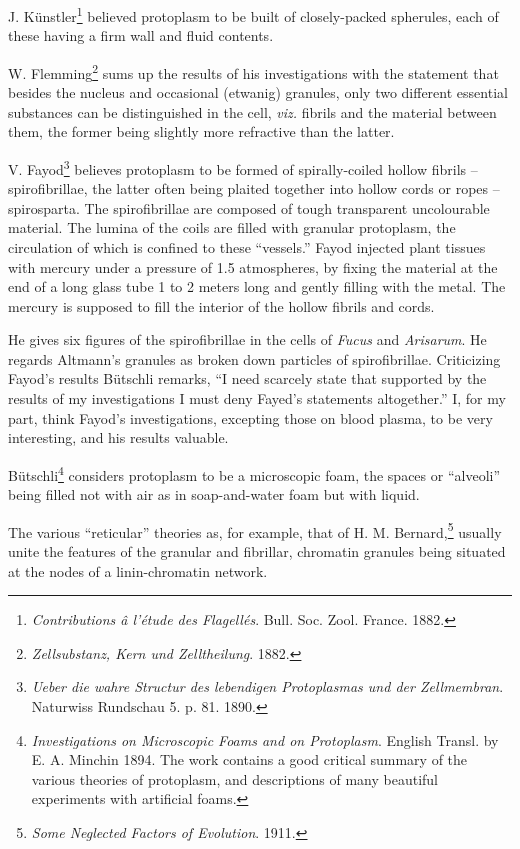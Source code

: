 \documentclass[a4paper, 12pt, oneside]{article}
\begin{document}
J. Künstler\footnote{\emph{Contributions â l'étude des Flagellés}. Bull. Soc. Zool. France. 1882.} believed protoplasm to be built of closely-packed spherules, each of these having a firm wall and fluid contents.

W. Flemming\footnote{\emph{Zellsubstanz, Kern und Zelltheilung}. 1882.} sums up the results of his investigations with the statement that besides the nucleus and occasional (etwanig) granules, only two different essential substances can be distinguished in the cell, \emph{viz.} fibrils and the material between them, the former being slightly more refractive than the latter.

V. Fayod\footnote{\emph{Ueber die wahre Structur des lebendigen Protoplasmas und der Zellmembran}. Naturwiss Rundschau 5. p. 81. 1890.} believes protoplasm to be formed of spirally-coiled hollow fibrils -- spirofibrillae, the latter often being plaited together into hollow cords or ropes -- spirosparta. The spirofibrillae are composed of tough transparent uncolourable material. The lumina of the coils are filled with granular protoplasm, the circulation of which is confined to these ``vessels.'' Fayod injected plant tissues with mercury under a pressure of 1.5 atmospheres, by fixing the material at the end of a long glass tube 1 to 2 meters long and gently filling with the metal. The mercury is supposed to fill the interior of the hollow fibrils and cords.

He gives six figures of the spirofibrillae in the cells of \emph{Fucus} and \emph{Arisarum}. He regards Altmann's granules as broken down particles of spirofibrillae. Criticizing Fayod's results Bütschli remarks, ``I need scarcely state that supported by the results of my investigations I must deny Fayed's statements altogether.'' I, for my part, think Fayod's investigations, excepting those on blood plasma, to be very interesting, and his results valuable.

Bütschli\footnote{\emph{Investigations on Microscopic Foams and on Protoplasm}. English Transl. by E. A. Minchin 1894. The work contains a good critical summary of the various theories of protoplasm, and descriptions of many beautiful experiments with artificial foams.} considers protoplasm to be a microscopic foam, the spaces or ``alveoli'' being filled not with air as in soap-and-water foam but with liquid.

The various ``reticular'' theories as, for example, that of H. M. Bernard,\footnote{\emph{Some Neglected Factors of Evolution}. 1911.} usually unite the features of the granular and fibrillar, chromatin granules being situated at the nodes of a linin-chromatin network.
\end{document}
